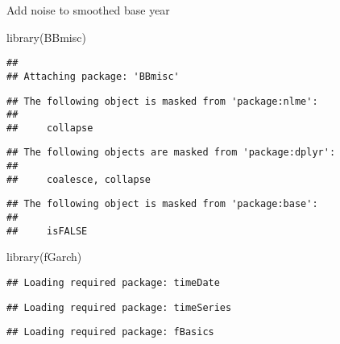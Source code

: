 \documentclass[
]{article}
\newenvironment{Shaded}{\begin{snugshade}}{\end{snugshade}}
\newcommand{\FunctionTok}[1]{\textcolor[rgb]{0.00,0.00,0.00}{#1}}
\newcommand{\NormalTok}[1]{#1}
\begin{document}
Add noise to smoothed base year

\begin{Shaded}
\begin{Highlighting}[]
\FunctionTok{library}\NormalTok{(BBmisc)}
\end{Highlighting}
\end{Shaded}

\begin{verbatim}
## 
## Attaching package: 'BBmisc'
\end{verbatim}

\begin{verbatim}
## The following object is masked from 'package:nlme':
## 
##     collapse
\end{verbatim}

\begin{verbatim}
## The following objects are masked from 'package:dplyr':
## 
##     coalesce, collapse
\end{verbatim}

\begin{verbatim}
## The following object is masked from 'package:base':
## 
##     isFALSE
\end{verbatim}

\begin{Shaded}
\begin{Highlighting}[]
\FunctionTok{library}\NormalTok{(fGarch)}
\end{Highlighting}
\end{Shaded}

\begin{verbatim}
## Loading required package: timeDate
\end{verbatim}

\begin{verbatim}
## Loading required package: timeSeries
\end{verbatim}

\begin{verbatim}
## Loading required package: fBasics
\end{verbatim}
\end{document}
